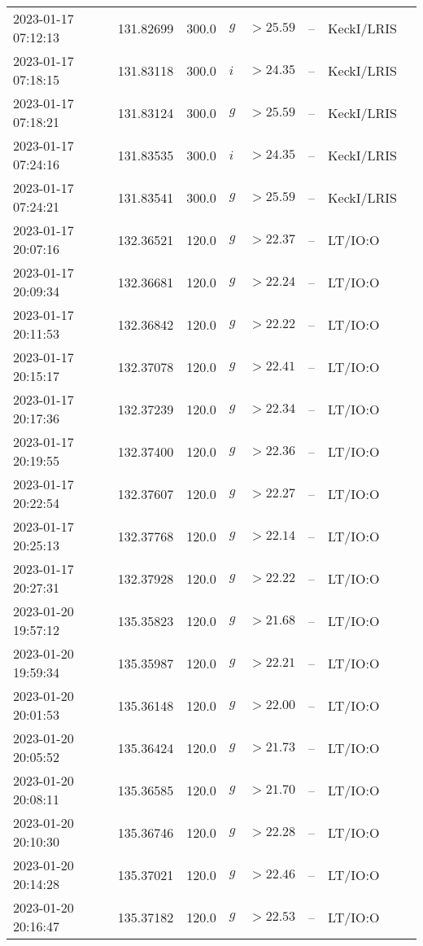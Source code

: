 \documentclass{nature_plusfigure}
\begin{document}
\begin{supplement}
\begin{center}
\begin{longtable}{llllllll}
2023-01-17 07:12:13 & 131.82699 & 300.0 & $g$ & $>25.59$ & -- & KeckI/LRIS &  \\ 
2023-01-17 07:18:15 & 131.83118 & 300.0 & $i$ & $>24.35$ & -- & KeckI/LRIS &  \\ 
2023-01-17 07:18:21 & 131.83124 & 300.0 & $g$ & $>25.59$ & -- & KeckI/LRIS &  \\ 
2023-01-17 07:24:16 & 131.83535 & 300.0 & $i$ & $>24.35$ & -- & KeckI/LRIS &  \\ 
2023-01-17 07:24:21 & 131.83541 & 300.0 & $g$ & $>25.59$ & -- & KeckI/LRIS &  \\ 
2023-01-17 20:07:16 & 132.36521 & 120.0 & $g$ & $>22.37$ & -- & LT/IO:O &  \\ 
2023-01-17 20:09:34 & 132.36681 & 120.0 & $g$ & $>22.24$ & -- & LT/IO:O &  \\ 
2023-01-17 20:11:53 & 132.36842 & 120.0 & $g$ & $>22.22$ & -- & LT/IO:O &  \\ 
2023-01-17 20:15:17 & 132.37078 & 120.0 & $g$ & $>22.41$ & -- & LT/IO:O &  \\ 
2023-01-17 20:17:36 & 132.37239 & 120.0 & $g$ & $>22.34$ & -- & LT/IO:O &  \\ 
2023-01-17 20:19:55 & 132.37400 & 120.0 & $g$ & $>22.36$ & -- & LT/IO:O &  \\ 
2023-01-17 20:22:54 & 132.37607 & 120.0 & $g$ & $>22.27$ & -- & LT/IO:O &  \\ 
2023-01-17 20:25:13 & 132.37768 & 120.0 & $g$ & $>22.14$ & -- & LT/IO:O &  \\ 
2023-01-17 20:27:31 & 132.37928 & 120.0 & $g$ & $>22.22$ & -- & LT/IO:O &  \\ 
2023-01-20 19:57:12 & 135.35823 & 120.0 & $g$ & $>21.68$ & -- & LT/IO:O &  \\ 
2023-01-20 19:59:34 & 135.35987 & 120.0 & $g$ & $>22.21$ & -- & LT/IO:O &  \\ 
2023-01-20 20:01:53 & 135.36148 & 120.0 & $g$ & $>22.00$ & -- & LT/IO:O &  \\ 
2023-01-20 20:05:52 & 135.36424 & 120.0 & $g$ & $>21.73$ & -- & LT/IO:O &  \\ 
2023-01-20 20:08:11 & 135.36585 & 120.0 & $g$ & $>21.70$ & -- & LT/IO:O &  \\ 
2023-01-20 20:10:30 & 135.36746 & 120.0 & $g$ & $>22.28$ & -- & LT/IO:O &  \\ 
2023-01-20 20:14:28 & 135.37021 & 120.0 & $g$ & $>22.46$ & -- & LT/IO:O &  \\ 
2023-01-20 20:16:47 & 135.37182 & 120.0 & $g$ & $>22.53$ & -- & LT/IO:O &  \\ 

\end{longtable}
\end{center}
\end{supplement}
\end{document}
